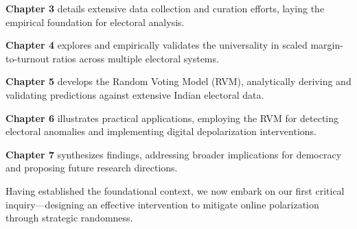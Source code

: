 \textbf{Chapter 3} details extensive data collection and curation efforts, laying the empirical foundation for electoral analysis.

\textbf{Chapter 4} explores and empirically validates the universality in scaled margin-to-turnout ratios across multiple electoral systems.

\textbf{Chapter 5} develops the Random Voting Model (RVM), analytically deriving and validating predictions against extensive Indian electoral data.

\textbf{Chapter 6} illustrates practical applications, employing the RVM for detecting electoral anomalies and implementing digital depolarization interventions.

\textbf{Chapter 7} synthesizes findings, addressing broader implications for democracy and proposing future research directions.

Having established the foundational context, we now embark on our first critical inquiry—designing an effective intervention to mitigate online polarization through strategic randomness.